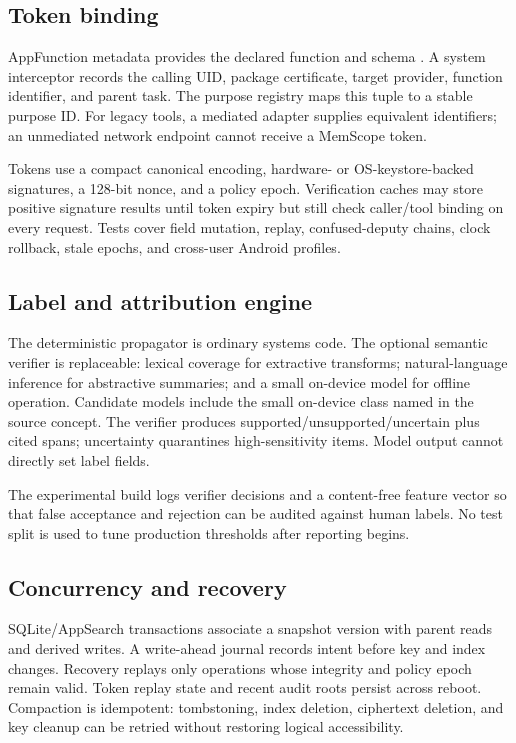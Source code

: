 \subsection{Token binding}

AppFunction metadata provides the declared function and schema \citep{android2026appfunctions}. A system interceptor records the calling UID, package certificate, target provider, function identifier, and parent task. The purpose registry maps this tuple to a stable purpose ID. For legacy tools, a mediated adapter supplies equivalent identifiers; an unmediated network endpoint cannot receive a MemScope token.

Tokens use a compact canonical encoding, hardware- or OS-keystore-backed signatures, a 128-bit nonce, and a policy epoch. Verification caches may store positive signature results until token expiry but still check caller/tool binding on every request. Tests cover field mutation, replay, confused-deputy chains, clock rollback, stale epochs, and cross-user Android profiles.

\subsection{Label and attribution engine}

The deterministic propagator is ordinary systems code. The optional semantic verifier is replaceable: lexical coverage for extractive transforms; natural-language inference for abstractive summaries; and a small on-device model for offline operation. Candidate models include the small on-device class named in the source concept. The verifier produces supported/unsupported/uncertain plus cited spans; uncertainty quarantines high-sensitivity items. Model output cannot directly set label fields.

The experimental build logs verifier decisions and a content-free feature vector so that false acceptance and rejection can be audited against human labels. No test split is used to tune production thresholds after reporting begins.

\subsection{Concurrency and recovery}

SQLite/AppSearch transactions associate a snapshot version with parent reads and derived writes. A write-ahead journal records intent before key and index changes. Recovery replays only operations whose integrity and policy epoch remain valid. Token replay state and recent audit roots persist across reboot. Compaction is idempotent: tombstoning, index deletion, ciphertext deletion, and key cleanup can be retried without restoring logical accessibility.

